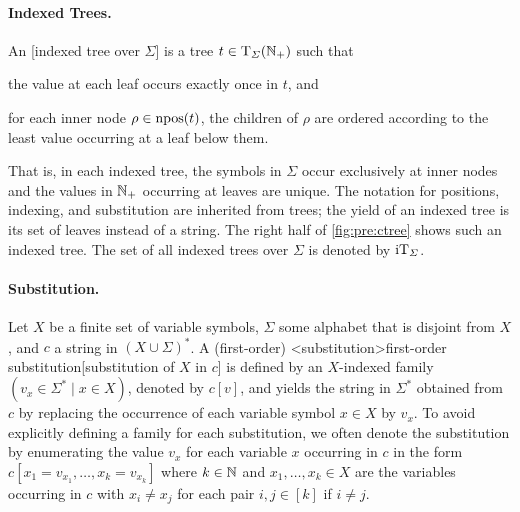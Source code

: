 \documentclass[../document.tex]{subfiles}
\begin{document}
    \paragraph{Indexed Trees.}
    An [indexed tree over \(\varSigma\)] is a tree \(t \in \operatorname{T}_{\varSigma}(\mathbb{N}_+)\) such that \begin{inparaenum}
        \item the value at each leaf occurs exactly once in \(t\), and
        \item for each inner node \(\rho \in \operatorname{npos}(t)\), the children of \(\rho\) are ordered according to the least value occurring at a leaf below them.
    \end{inparaenum}
    That is, in each indexed tree, the symbols in \(\varSigma\) occur exclusively at inner nodes and the values in \(\mathbb{N}_+\) occurring at leaves are unique.
    The notation for positions, indexing, and substitution are inherited from trees; the yield of an indexed tree is its set of leaves instead of a string.
    The right half of \cref{fig:pre:ctree} shows such an indexed tree.
    The set of all indexed trees over \(\varSigma\) is denoted by \(\operatorname{iT}_\varSigma\).

    \paragraph{Substitution.}
    Let \(X\) be a finite set of variable symbols, \(\varSigma\) some alphabet that is disjoint from \(X\), and \(c\) a string in \((X \cup \varSigma)^*\).
    A (first-order) <substitution>{first-order substitution}[substitution of \(X\) in \(c\)] is defined by an \(X\)-indexed family \((v_x \in \varSigma^* \mid x \in X)\), denoted by \(c[v]\), and yields the string in \(\varSigma^*\) obtained from \(c\) by replacing the occurrence of each variable symbol \(x \in X\) by \(v_x\).
    To avoid explicitly defining a family for each substitution, we often denote the substitution by enumerating the value \(v_x\) for each variable \(x\) occurring in \(c\) in the form \(c[x_1=v_{x_1}, \ldots, x_{k}=v_{x_k}]\) where \(k \in \mathbb{N}\) and \(x_1, \ldots, x_k \in X\) are the variables occurring in \(c\) with \(x_i \neq x_j\) for each pair \(i,j\in [k]\) if \(i\neq j\).
\end{document}
